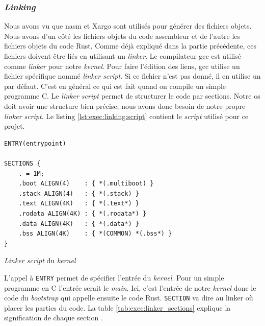 \subsubsection{\textit{Linking}}
\label{linking}
Nous avons vu que \acrshort{nasm} et Xargo sont utilisés pour générer des fichiers
objets. Nous avons d'un côté les fichiers objets du code assembleur et de l'autre
les fichiers objets du code Rust. Comme déjà expliqué dans la partie précédente,
ces fichiers doivent être liés en utilisant un \textit{linker}. Le compilateur
\acrshort{gcc} est utilisé comme \textit{linker} pour notre \textit{kernel}.
Pour faire l'édition des liens, \acrshort{gcc} utilise un fichier spécifique nommé
\textit{linker script}. Si ce fichier n'est pas donné, il en utilise un par
défaut. C'est en général ce qui est fait quand on compile un simple programme C.
Le \textit{linker script} permet de structurer le code par sections. Notre
\acrshort{os} doit avoir une structure bien précise, nous avons donc besoin de
notre propre \textit{linker script}. Le listing \ref{lst:exec:linking:script}
contient le \textit{script} utilisé pour ce projet. \\

\begin{code}
\begin{verbatim}
ENTRY(entrypoint)

SECTIONS {
    . = 1M;
    .boot ALIGN(4)    : { *(.multiboot) }
    .stack ALIGN(4)   : { *(.stack) }
    .text ALIGN(4K)   : { *(.text*) }
    .rodata ALIGN(4K) : { *(.rodata*) }
    .data ALIGN(4K)   : { *(.data*) }
    .bss ALIGN(4K)    : { *(COMMON) *(.bss*) }
}
\end{verbatim}
\caption{\textit{Linker script} du \textit{kernel}}
\label{lst:exec:linking:script}
\end{code} \bigbreak

L'appel à \texttt{ENTRY} permet de spécifier l'entrée du \textit{kernel}.
Pour un simple programme en C l'entrée serait le \textit{main}. Ici, c'est
l'entrée de notre \textit{kernel} donc le code du \textit{bootstrap} qui appelle
ensuite le code Rust. \texttt{SECTION} va dire au linker où placer les
parties du code. La table \ref{tab:exec:linker_sections} explique la signification
de chaque section \cite{ref42,ref9,ref10,ref11}.


